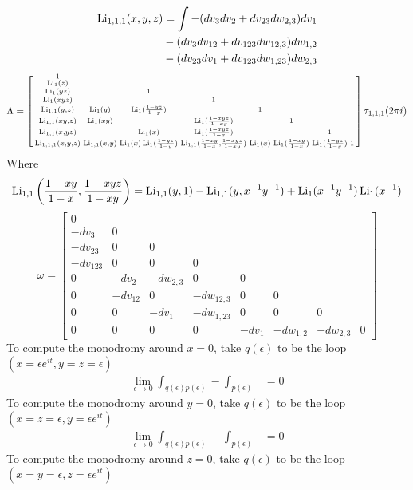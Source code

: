 \documentclass[main]{subfiles}
\begin{document}
\begin{align*}
\operatorname{Li}_{1,1,1}(x,y,z)&=\int -(dv_3dv_2+dv_{23}dw_{2,3})dv_1 \\
&-(dv_3dv_{12}+dv_{123}dw_{12,3})dw_{1,2} \\
&-(dv_{23}dv_1+dv_{123}dw_{1,23})dw_{2,3}
\end{align*}
\[\Lambda=\left[\begin{smallmatrix}
1&&&&&&&\\
\operatorname{Li}_{1}(z)&1&&&&&&\\
\operatorname{Li}_{1}(yz)&&1&&&&&\\
\operatorname{Li}_{1}(xyz)&&&1&&&&\\
\operatorname{Li}_{1,1}(y,z)&\operatorname{Li}_1(y)&\operatorname{Li}_1(\frac{1-yz}{1-y})&&1&&&\\
\operatorname{Li}_{1,1}(xy,z)&\operatorname{Li}_1(xy)&&\operatorname{Li}_1(\frac{1-xyz}{1-xy})&&1&&\\
\operatorname{Li}_{1,1}(x,yz)&&\operatorname{Li}_1(x)&\operatorname{Li}_1(\frac{1-xyz}{1-x})&&&1&\\
\operatorname{Li}_{1,1,1}(x,y,z)&\operatorname{Li}_{1,1}(x,y)&\operatorname{Li}_1(x)\operatorname{Li}_1(\frac{1-yz}{1-y})&\operatorname{Li}_{1,1}(\frac{1-xy}{1-x},\frac{1-xyz}{1-xy})&\operatorname{Li}_1(x)&\operatorname{Li}_1(\frac{1-xy}{1-x})&\operatorname{Li}_1(\frac{1-yz}{1-y})&1
\end{smallmatrix}\right]\tau_{1,1,1}(2\pi i)\]
Where
\[\operatorname{Li}_{1,1}\left(\frac{1-xy}{1-x},\frac{1-xyz}{1-xy}\right)=\operatorname{Li}_{1,1}(y,1)-\operatorname{Li}_{1,1}(y,x^{-1}y^{-1})+\operatorname{Li}_1(x^{-1}y^{-1})\operatorname{Li}_1(x^{-1})\]
\[\omega=\left[\begin{smallmatrix}
0\\
-dv_3&0\\
-dv_{23}&0&0\\
-dv_{123}&0&0&0\\
0&-dv_2&-dw_{2,3}&0&0\\
0&-dv_{12}&0&-dw_{12,3}&0&0\\
0&0&-dv_1&-dw_{1,23}&0&0&0\\
0&0&0&0&-dv_1&-dw_{1,2}&-dw_{2,3}&0
\end{smallmatrix}\right]\]
To compute the monodromy around $x=0$, take $q(\epsilon)$ to be the loop $(x=\epsilon e^{it},y=z=\epsilon)$
\begin{align*}
\lim_{\epsilon\to0}\int_{q(\epsilon)p(\epsilon)}-\int_{p(\epsilon)}&=0
\end{align*}
To compute the monodromy around $y=0$, take $q(\epsilon)$ to be the loop $(x=z=\epsilon,y=\epsilon e^{it})$
\begin{align*}
\lim_{\epsilon\to0}\int_{q(\epsilon)p(\epsilon)}-\int_{p(\epsilon)}&=0
\end{align*}
To compute the monodromy around $z=0$, take $q(\epsilon)$ to be the loop $(x=y=\epsilon,z=\epsilon e^{it})$
\end{document}
